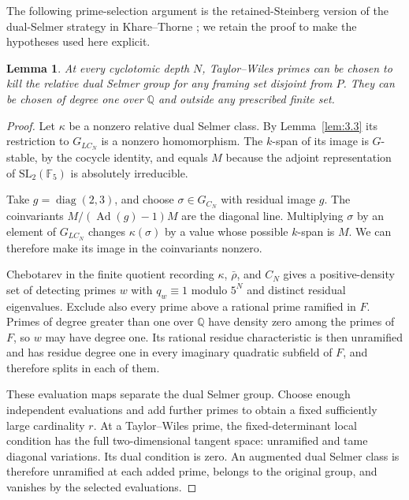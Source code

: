 \documentclass[11pt,a4paper]{article}
\newtheorem{lemma}[theorem]{Lemma}
\numberwithin{equation}{section}
\begin{document}
The following prime-selection argument is the retained-Steinberg version of the dual-Selmer strategy in Khare--Thorne \cite[Propositions~6.6 and~6.10]{KT}; we retain the proof to make the hypotheses used here explicit.

\begin{lemma}\label{lem:3.4}
At every cyclotomic depth \(N\), Taylor--Wiles primes can be chosen to kill the relative dual Selmer group for any framing set disjoint from \(P\). They can be chosen of degree one over \(\mathbb Q\) and outside any prescribed finite set.
\end{lemma}

\begin{proof}
Let \(\kappa\) be a nonzero relative dual Selmer class. By Lemma~\ref{lem:3.3} its restriction to \(G_{LC_N}\) is a nonzero homomorphism. The \(k\)-span of its image is \(G\)-stable, by the cocycle identity, and equals \(M\) because the adjoint representation of \(\mathrm{SL}_2(\mathbb F_5)\) is absolutely irreducible.

Take \(g=\operatorname{diag}(2,3)\), and choose \(\sigma\in G_{C_N}\) with residual image \(g\). The coinvariants \(M/(\operatorname{Ad}(g)-1)M\) are the diagonal line. Multiplying \(\sigma\) by an element of \(G_{LC_N}\) changes \(\kappa(\sigma)\) by a value whose possible \(k\)-span is \(M\). We can therefore make its image in the coinvariants nonzero.

Chebotarev in the finite quotient recording \(\kappa\), \(\bar\rho\), and \(C_N\) gives a positive-density set of detecting primes \(w\) with \(q_w\equiv1\) modulo \(5^N\) and distinct residual eigenvalues. Exclude also every prime above a rational prime ramified in \(F\). Primes of degree greater than one over \(\mathbb Q\) have density zero among the primes of \(F\), so \(w\) may have degree one. Its rational residue characteristic is then unramified and has residue degree one in every imaginary quadratic subfield of \(F\), and therefore splits in each of them.

These evaluation maps separate the dual Selmer group. Choose enough independent evaluations and add further primes to obtain a fixed sufficiently large cardinality \(r\). At a Taylor--Wiles prime, the fixed-determinant local condition has the full two-dimensional tangent space: unramified and tame diagonal variations. Its dual condition is zero. An augmented dual Selmer class is therefore unramified at each added prime, belongs to the original group, and vanishes by the selected evaluations.
\end{proof}
\end{document}
